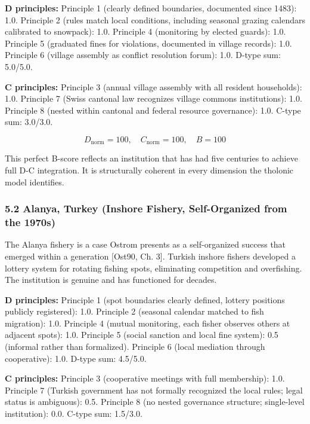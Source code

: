 \documentclass[
  11pt,
  letterpaper,
]{article}
\begin{document}
\textbf{D principles:} Principle 1 (clearly defined boundaries,
documented since 1483): 1.0. Principle 2 (rules match local conditions,
including seasonal grazing calendars calibrated to snowpack): 1.0.
Principle 4 (monitoring by elected guards): 1.0. Principle 5 (graduated
fines for violations, documented in village records): 1.0. Principle 6
(village assembly as conflict resolution forum): 1.0. D-type sum:
5.0/5.0.

\textbf{C principles:} Principle 3 (annual village assembly with all
resident households): 1.0. Principle 7 (Swiss cantonal law recognizes
village commons institutions): 1.0. Principle 8 (nested within cantonal
and federal resource governance): 1.0. C-type sum: 3.0/3.0.

\[D_{\text{norm}} = 100, \quad C_{\text{norm}} = 100, \quad B = 100\]

This perfect B-score reflects an institution that has had five centuries
to achieve full D-C integration. It is structurally coherent in every
dimension the tholonic model identifies.

\subsubsection{5.2 Alanya, Turkey (Inshore Fishery, Self-Organized from
the
1970s)}\label{alanya-turkey-inshore-fishery-self-organized-from-the-1970s}

The Alanya fishery is a case Ostrom presents as a self-organized success
that emerged within a generation {[}Ost90, Ch. 3{]}. Turkish inshore
fishers developed a lottery system for rotating fishing spots,
eliminating competition and overfishing. The institution is genuine and
has functioned for decades.

\textbf{D principles:} Principle 1 (spot boundaries clearly defined,
lottery positions publicly registered): 1.0. Principle 2 (seasonal
calendar matched to fish migration): 1.0. Principle 4 (mutual
monitoring, each fisher observes others at adjacent spots): 1.0.
Principle 5 (social sanction and local fine system): 0.5 (informal
rather than formalized). Principle 6 (local mediation through
cooperative): 1.0. D-type sum: 4.5/5.0.

\textbf{C principles:} Principle 3 (cooperative meetings with full
membership): 1.0. Principle 7 (Turkish government has not formally
recognized the local rules; legal status is ambiguous): 0.5. Principle 8
(no nested governance structure; single-level institution): 0.0. C-type
sum: 1.5/3.0.
\end{document}
